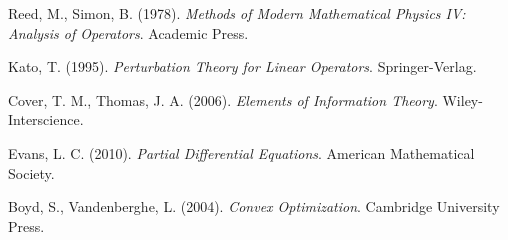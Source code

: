 \documentclass[12pt]{article}
\begin{document}

\begin{thebibliography}{99}

Reed, M., Simon, B. (1978). 
\textit{Methods of Modern Mathematical Physics IV: Analysis of Operators}. 
Academic Press.

Kato, T. (1995). 
\textit{Perturbation Theory for Linear Operators}. 
Springer-Verlag.

Cover, T. M., Thomas, J. A. (2006). 
\textit{Elements of Information Theory}. 
Wiley-Interscience.

Evans, L. C. (2010). 
\textit{Partial Differential Equations}. 
American Mathematical Society.

Boyd, S., Vandenberghe, L. (2004).
\textit{Convex Optimization}.
Cambridge University Press.

\end{thebibliography}
\end{document}

